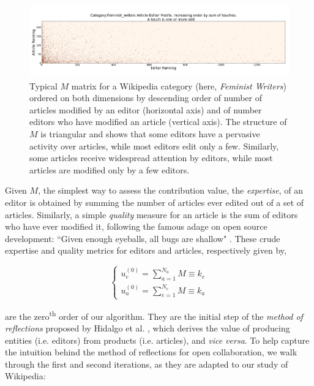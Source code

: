 \begin{figure}[!t]
\centering
\includegraphics[width=2.0\columnwidth]{../Figures/Category_Feminist_writerstriangle_matrix_corrected.png}
\caption{Typical $\mathbf{\mathit{M}}$ matrix for a Wikipedia category (here, {\it Feminist Writers}) ordered on both dimensions by descending order of number of articles modified by an editor (horizontal axis) and of number editors who have modified an article (vertical axis). The structure of $\mathbf{\mathit{M}}$ is triangular and shows that some editors have a pervasive activity over articles, while most editors edit only a few. Similarly, some articles receive widespread attention by editors, while most articles are modified only by a few editors.}
\label{fig:triangle}
\end{figure}


Given $M$, the simplest way to assess the contribution value, the {\it expertise}, of an editor is obtained by summing the number of articles ever edited out of a set of articles. Similarly, a simple {\it quality} measure for an article is the sum of editors who have ever modified it, following the famous adage on open source development: ``Given enough eyeballs, all bugs are shallow" \cite{raymond1999}. These crude expertise and quality metrics for editors and articles, respectively  given by,

\begin{equation}
\begin{cases}
 u_{e}^{(0)} = \sum_{a=1}^{N_{a}} M \equiv k_e\\[7pt]
 u_{a}^{(0)} = \sum_{e=1}^{N_{e}} M \equiv k_a
\end{cases}
\label{HHinit}
\end{equation}

are the zero\textsuperscript{th} order of our algorithm. They are the initial step of the {\it method of reflections} proposed by Hidalgo et al. \cite{hidalgo2007,hidalgo2009}, which derives the value of producing entities (i.e. editors) from products (i.e. articles), and {\it vice versa}. To help capture the intuition behind the method of reflections for open collaboration, we walk through the first and second iterations, as they are adapted to our study of Wikipedia:

